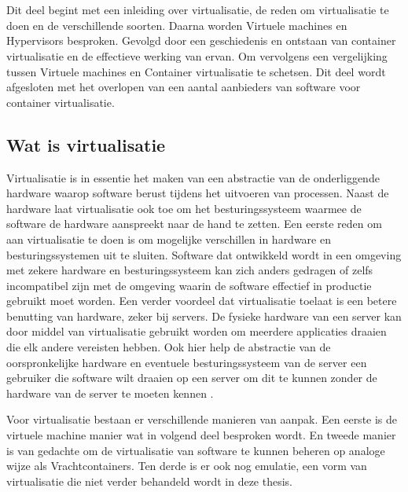 \chapter{}
\label{ch:stand-van-zaken}
Dit deel begint met een inleiding over virtualisatie, de reden om virtualisatie te doen en de verschillende soorten. Daarna worden Virtuele machines en Hypervisors besproken. Gevolgd door een geschiedenis en ontstaan van container virtualisatie en de  effectieve werking van ervan. Om vervolgens een vergelijking tussen Virtuele machines en Container virtualisatie te schetsen. Dit deel wordt afgesloten met het overlopen van een aantal aanbieders van software voor container virtualisatie. 


\section{Wat is virtualisatie}

Virtualisatie is in essentie het maken van een abstractie van de onderliggende hardware waarop  software berust tijdens het uitvoeren van processen. Naast de hardware laat virtualisatie ook toe om het besturingssysteem waarmee de software de hardware aanspreekt naar de hand te zetten. Een eerste reden om aan virtualisatie te doen is om mogelijke verschillen in hardware en besturingssystemen uit te sluiten.  Software dat ontwikkeld wordt in een omgeving met zekere hardware en besturingssysteem kan zich anders gedragen of zelfs incompatibel zijn met de omgeving waarin de software effectief in productie gebruikt  moet worden. Een verder voordeel dat virtualisatie toelaat is een betere benutting van hardware, zeker bij servers. De fysieke hardware van een server kan door middel van virtualisatie  gebruikt worden om meerdere applicaties draaien die elk andere vereisten hebben. Ook hier help de abstractie van de oorspronkelijke hardware en eventuele besturingssysteem van de server een gebruiker die software wilt draaien op een server om dit te kunnen zonder de hardware van de server te moeten kennen \Autocite{Yadav2018,Jangla2018}.

Voor virtualisatie bestaan er verschillende manieren van aanpak. Een eerste is de virtuele machine manier wat in volgend deel besproken wordt. En tweede manier is van gedachte om de virtualisatie van software te kunnen beheren  op analoge wijze als Vrachtcontainers. Ten derde is er ook nog emulatie, een vorm van virtualisatie die niet verder behandeld wordt in deze thesis.

